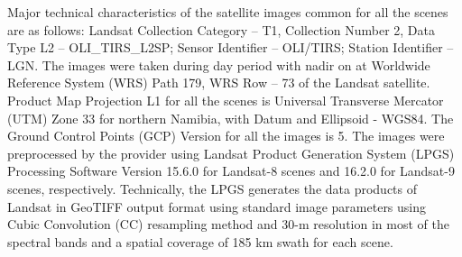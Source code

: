 \documentclass[climate,article,submit,pdftex,moreauthors]{Definitions/mdpi}
\begin{document}
Major technical characteristics of the satellite images common for all the scenes are as follows: Landsat Collection Category -- T1, Collection Number 2, Data Type L2 -- OLI\_TIRS\_L2SP; Sensor Identifier -- OLI/TIRS; Station Identifier -- LGN. The images were taken during day period with nadir on at Worldwide Reference System (WRS) Path 179, WRS Row -- 73 of the Landsat satellite. Product Map Projection L1 for all the scenes is Universal Transverse Mercator (UTM) Zone 33 for northern Namibia, with Datum and Ellipsoid - WGS84. The Ground Control Points (GCP) Version for all the images is 5. The images were preprocessed by the provider using Landsat Product Generation System (LPGS) Processing Software Version 15.6.0 for Landsat-8 scenes and 16.2.0 for Landsat-9 scenes, respectively. Technically, the LPGS generates the data products of Landsat in GeoTIFF output format using standard image parameters using Cubic Convolution (CC) resampling method and 30-m resolution in most of the spectral bands and a spatial coverage of 185 km swath for each scene. 
\end{document}
